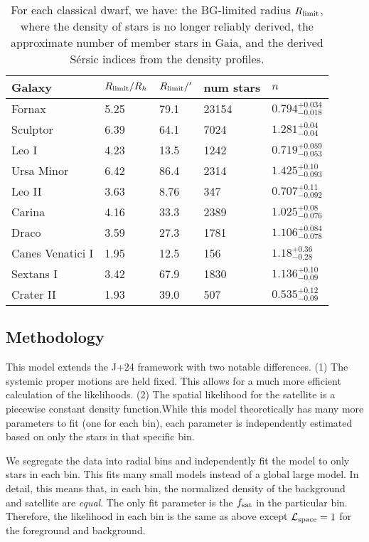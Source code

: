 \begin{table*}[t]
\centering
\caption[Properties of probabilistically-derived density profiles]{For each classical dwarf, we have: the BG-limited radius $R_{\rm limit}$, where the density of stars is no longer reliably derived, the approximate number of member stars in Gaia, and the derived Sérsic indices from the density profiles. }
\label{tbl:mcmc_props}
\begin{tabular}{lllll}
\toprule
Galaxy & $R_{\rm limit} / R_h$ & $R_{\rm limit} / '$ & num stars & $n$\\
\midrule
Fornax & 5.25 & 79.1 & 23154 & $0.794^{+0.034}_{-0.018}$\\
Sculptor & 6.39 & 64.1 & 7024 & $1.281^{+0.04}_{-0.04}$\\
Leo I & 4.23 & 13.5 & 1242 & $0.719^{+0.059}_{-0.053}$\\
Ursa Minor & 6.42 & 86.4 & 2314 & $1.425^{+0.10}_{-0.093}$\\
Leo II & 3.63 & 8.76 & 347 & $0.707^{+0.11}_{-0.092}$\\
Carina & 4.16 & 33.3 & 2389 & $1.025^{+0.08}_{-0.076}$\\
Draco & 3.59 & 27.3 & 1781 & $1.106^{+0.084}_{-0.078}$\\
Canes Venatici I & 1.95 & 12.5 & 156 & $1.18^{+0.36}_{-0.28}$\\
Sextans I & 3.42 & 67.9 & 1830 & $1.136^{+0.10}_{-0.09}$\\
Crater II & 1.93 & 39.0 & 507 & $0.535^{+0.12}_{-0.09}$\\
\bottomrule
\end{tabular}
\end{table*}

\subsection{Methodology}\label{methodology}

This model extends the J+24 framework with two notable differences. (1)
The systemic proper motions are held fixed. This allows for a much more
efficient calculation of the likelihoods. (2) The spatial likelihood for
the satellite is a piecewise constant density function.While this model
theoretically has many more parameters to fit (one for each bin), each
parameter is independently estimated based on only the stars in that
specific bin.

We segregate the data into radial bins and independently fit the model
to only stars in each bin. This fits many small models instead of a
global large model. In detail, this means that, in each bin, the
normalized density of the background and satellite are \emph{equal}. The
only fit parameter is the \(f_{\rm sat}\) in the particular bin.
Therefore, the likelihood in each bin is the same as above except
\({\cal L}_{\rm space} = 1\) for the foreground and background.


